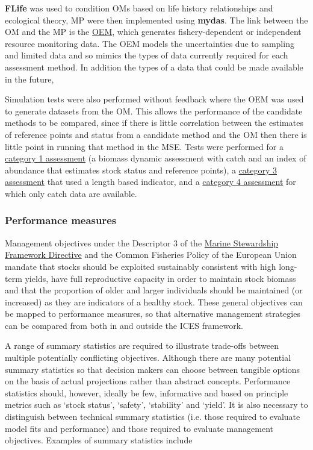 \textbf{FLife} was used to  condition OMs based on life history relationships and ecological theory, MP were then implemented using \textbf{mydas}. The link between the OM and the MP is the \href{https://3o2y9wugzp1kfxr5hvzgzq-on.drv.tw/MyDas/vignettes/mydas_oem.html}{OEM}, which generates fishery-dependent or independent resource monitoring data. The OEM models the uncertainties due to sampling and limited data and so mimics the types of data currently required for each assessment method. In addition the types of a data that could be made available in the future,

Simulation tests were also performed without feedback where the OEM was used to generate datasets from the OM. This allows the performance of the candidate methods to be compared, since if there is little correlation between the estimates of reference points and status from a candidate method and the OM then there is little point in running that method in the MSE. Tests were performed for a 
\href{https://3o2y9wugzp1kfxr5hvzgzq-on.drv.tw/MyDas/tasks/4/simtest-bd.html}{category 1 assessment} (a biomass dynamic assessment with catch and an index of abundance that estimates stock status and reference points), a \href{https://3o2y9wugzp1kfxr5hvzgzq-on.drv.tw/MyDas/tasks/4/simtest-lbspr.html}{category 3 assessment} that used a length based indicator, and a \href{https://3o2y9wugzp1kfxr5hvzgzq-on.drv.tw/MyDas/tasks/4/simtest-bdsra.html}{category 4 assessment} for which only catch data are available.

\subsubsection*{Performance measures} 

Management objectives under the Descriptor 3 of the \href{http://ec.europa.eu/environment/marine/good-environmental-status/descriptor-3/index_en.htm}{Marine Stewardship Framework Directive} and the Common Fisheries Policy of the European Union mandate that stocks should be exploited sustainably consistent with high long-term yields, have full reproductive capacity in order to maintain stock biomass and that the proportion of older and larger individuals should be maintained (or increased) as they are indicators of a healthy stock. These general objectives can be mapped to performance measures, so that alternative management strategies can be compared from both in and outside the ICES framework. %

A range of summary statistics are required to illustrate trade-offs between multiple potentially conflicting objectives. Although there are many potential summary statistics so that decision makers can choose between tangible options on the basis of actual projections rather than abstract concepts. Performance statistics should, however, ideally be few, informative and based on principle metrics such as `stock status’, `safety', `stability' and `yield'. It is also necessary to distinguish between technical summary statistics (i.e. those required to evaluate model fits and performance) and those required to evaluate management objectives. Examples of summary statistics include 


